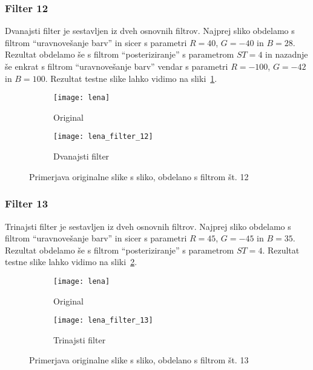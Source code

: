 \subsubsection*{Filter 12}
Dvanajsti filter je sestavljen iz dveh osnovnih filtrov. Najprej sliko obdelamo s
filtrom ``uravnovešanje barv'' in sicer s parametri $R = 40$, $G = -40$ in
$B = 28$. Rezultat obdelamo še s filtrom ``posteriziranje'' s parametrom
$ST= 4$ in nazadnje še enkrat s filtrom ``uravnovešanje barv'' vendar s
parametri $R = -100$, $G = -42$ in $B = 100$. Rezultat testne slike lahko
vidimo na sliki~\ref{fig:lena_filter_12}.

\begin{figure}[!ht]
    \centering
    \begin{subfigure}[b]{0.4\textwidth}
        \texttt{[image: lena]}
        \caption{Original}
    \end{subfigure}
    \begin{subfigure}[b]{0.4\textwidth}
        \texttt{[image: lena\_filter\_12]}
        \caption{Dvanajsti filter}
    \end{subfigure}
    \caption{Primerjava originalne slike s sliko, obdelano s filtrom št. 12}
    \label{fig:lena_filter_12}
\end{figure}


\subsubsection*{Filter 13}
Trinajsti filter je sestavljen iz dveh osnovnih filtrov. Najprej sliko obdelamo s
filtrom ``uravnovešanje barv'' in sicer s parametri $R = 45$, $G = -45$ in
$B = 35$. Rezultat obdelamo še s filtrom ``posteriziranje'' s parametrom
$ST =4$. Rezultat testne slike lahko vidimo na sliki~\ref{fig:lena_filter_13}.

\begin{figure}[!ht]
    \centering
    \begin{subfigure}[b]{0.4\textwidth}
        \texttt{[image: lena]}
        \caption{Original}
    \end{subfigure}
    \begin{subfigure}[b]{0.4\textwidth}
        \texttt{[image: lena\_filter\_13]}
        \caption{Trinajsti filter}
    \end{subfigure}
    \caption{Primerjava originalne slike s sliko, obdelano s filtrom št. 13}
    \label{fig:lena_filter_13}
\end{figure}


